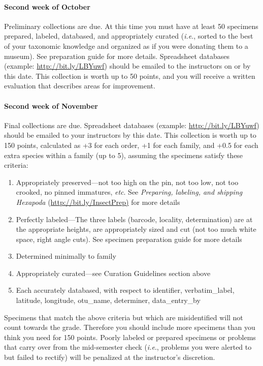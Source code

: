 \documentclass[letterpaper, 11pt]{article}
\begin{document}
\paragraph{Second week of October} Preliminary collections are due. At this time you must have at least 50 specimens prepared, labeled, databased, and appropriately curated (\textit{i.e}., sorted to the best of your taxonomic knowledge and organized as if you were donating them to a museum). See preparation guide for more details. Spreadsheet databases (example: \url{http://bit.ly/LBYuwf}) should be emailed to the instructors on or by this date. This collection is worth up to 50 points, and you will receive a written evaluation that describes areas for improvement.

\paragraph{Second week of November} Final collections are due. Spreadsheet databases (example: \url{http://bit.ly/LBYuwf}) should be emailed to your instructors by this date. This collection is worth up to 150 points, calculated as +3 for each order, +1 for each family, and +0.5 for each extra species within a family (up to 5), assuming the specimens satisfy these criteria:

\begin{enumerate}
\item Appropriately preserved---not too high on the pin, not too low, not too crooked, no pinned immatures, \textit{etc}. See \textit{Preparing, labeling, and shipping Hexapoda} (\url{http://bit.ly/InsectPrep)} for more details
\item Perfectly labeled---The three labels (barcode, locality, determination) are at the appropriate heights, are appropriately sized and cut (not too much white space, right angle cuts). See specimen preparation guide for more details
\item Determined minimally to family
\item Appropriately curated---see Curation Guidelines section above
\item Each accurately databased, with respect to identifier, verbatim\_label, latitude, longitude, otu\_name, determiner, data\_entry\_by
\end{enumerate}

Specimens that match the above criteria but which are misidentified will not count towards the grade. Therefore you should include more specimens than you think you need for 150 points. Poorly labeled or prepared specimens or problems that carry over from the mid-semester check (\textit{i.e}., problems you were alerted to but failed to rectify) will be penalized at the instructor’s discretion.
\end{document}
